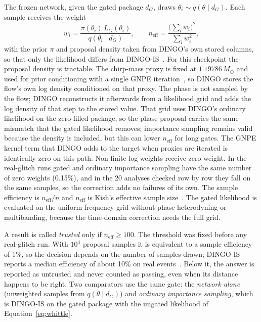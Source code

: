 \documentclass{openjournal}
\newcommand{\neff}{n_{\mathrm{eff}}}
\begin{document}
The frozen network, given the gated package $d_G$, draws $\theta_i\sim q(\theta\mid d_G)$.
Each sample receives the weight
\begin{equation}
w_i = \frac{\pi(\theta_i)\, L_G(\theta_i)}{q(\theta_i\mid d_G)},
\qquad
\neff = \frac{\bigl(\sum_i w_i\bigr)^2}{\sum_i w_i^2},
\label{eq:weights}
\end{equation}
with the prior $\pi$ and proposal density taken from DINGO's own stored columns, so that only the likelihood differs from DINGO-IS~\cite{Dax2023is}.
For this checkpoint the proposal density is tractable.
The chirp-mass proxy is fixed at $1.19786\,M_\odot$ and used for prior conditioning with a single GNPE iteration~\cite{Dax2022gnpe,Dax2025bns}, so DINGO stores the flow's own log density conditioned on that proxy.
The phase is not sampled by the flow; DINGO reconstructs it afterwards from a likelihood grid and adds the log density of that step to the stored value. That grid uses DINGO's ordinary likelihood on the zero-filled package, so the phase proposal carries the same mismatch that the gated likelihood removes; importance sampling remains valid because the density is included, but this can lower $\neff$ for long gates.
The GNPE kernel term that DINGO adds to the target when proxies are iterated is identically zero on this path.
Non-finite log weights receive zero weight. In the real-glitch runs gated and ordinary importance sampling have the same number of zero weights (0.15\%), and in the 20 analyses checked row by row they fall on the same samples, so the correction adds no failures of its own.
The sample efficiency is $\neff/n$ and $\neff$ is Kish's effective sample size~\cite{Kish1965}.
The gated likelihood is evaluated on the uniform frequency grid without phase heterodyning or multibanding, because the time-domain correction needs the full grid.

A result is called \emph{trusted} only if $\neff\ge100$.
The threshold was fixed before any real-glitch run.
With $10^{4}$ proposal samples it is equivalent to a sample efficiency of 1\%, so the decision depends on the number of samples drawn; DINGO-IS reports a median efficiency of about 10\% on real events~\cite{Dax2023is}.
Below it, the answer is reported as untrusted and never counted as passing, even when its distance happens to be right.
Two comparators use the same gate: the \emph{network alone} (unweighted samples from $q(\theta\mid d_G)$) and \emph{ordinary importance sampling}, which is DINGO-IS on the gated package with the ungated likelihood of Equation~\eqref{eq:whittle}.
\end{document}
